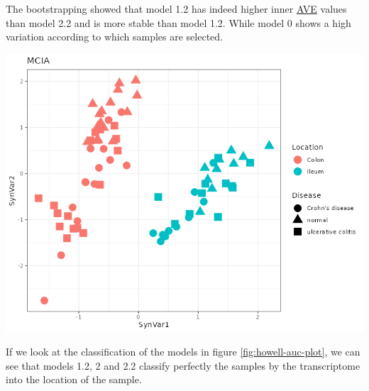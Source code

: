 \documentclass[
  12pt,
  a4paper,
  twoside,
  openright]{book}
\let\origfigure\figure
\let\endorigfigure\endfigure
\renewenvironment{figure}[1][2] {
    \expandafter\origfigure\expandafter[!htbp]
} {
    \endorigfigure
}
\begin{document}
The bootstrapping showed that model 1.2 has indeed higher inner \protect\hyperlink{acronyms_AVE}{AVE} values than model 2.2 and is more stable than model 1.2.
While model 0 shows a high variation according to which samples are selected.

\begin{figure}
\includegraphics[width=1\linewidth]{images/howell-mcia} \caption[MCIA dimensions in the Howell's dataset.]{MCIA dimensions on the Howell's dataset. The first dimensions separates by location. Each point represents a sample (colored by location and shape by disease).}\label{fig:howell-mcia}
\end{figure}

If we look at the classification of the models in figure \ref{fig:howell-auc-plot}, we can see that models 1.2, 2 and 2.2 classify perfectly the samples by the transcriptome into the location of the sample.
\end{document}
